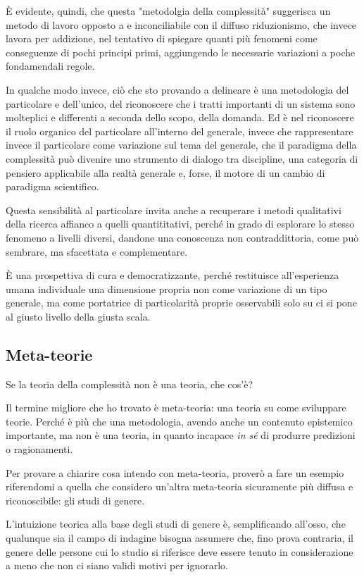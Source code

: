\documentclass[a4paper, headings=standardclasses]{scrartcl}
\begin{document}
È evidente, quindi, che questa "metodolgia della complessità" suggerisca un metodo di lavoro opposto a e inconciliabile con il diffuso riduzionismo, che invece lavora per addizione, nel tentativo di spiegare quanti più fenomeni come conseguenze di pochi principi primi, aggiungendo le necessarie variazioni a poche fondamendali regole.

In qualche modo invece, ciò che sto provando a delineare è una metodologia del particolare e dell'unico, del riconoscere che i tratti importanti di un sistema sono molteplici e differenti a seconda dello scopo, della domanda. Ed è nel riconoscere il ruolo organico del particolare all'interno del generale, invece che rappresentare invece il particolare come variazione sul tema del generale, che il paradigma della complessità può divenire uno strumento di dialogo tra discipline, una categoria di pensiero applicabile alla realtà generale e, forse, il motore di un cambio di paradigma scientifico.

Questa sensibilità al particolare invita anche a recuperare i metodi qualitativi della ricerca affianco a quelli quantititativi, perché in grado di esplorare lo stesso fenomeno a livelli diversi, dandone una conoscenza non contraddittoria, come può sembrare, ma sfacettata e complementare.

È una prospettiva di cura e democratizzante, perché restituisce all'esperienza umana individuale una dimensione propria non come variazione di un tipo generale, ma come portatrice di particolarità proprie osservabili solo su ci si pone al giusto livello della giusta scala.

\subsection{Meta-teorie}
Se la teoria della complessità non è una teoria, che cos'è?

Il termine migliore che ho trovato è meta-teoria: una teoria su come sviluppare teorie. Perché è più che una metodologia, avendo anche un contenuto epistemico importante, ma non è una teoria, in quanto incapace \textit{in sé} di produrre predizioni o ragionamenti.

Per provare a chiarire cosa intendo con meta-teoria, proverò a fare un esempio riferendomi a quella che considero un'altra meta-teoria sicuramente più diffusa e riconoscibile: gli studi di genere.

L'intuizione teorica alla base degli studi di genere è, semplificando all'osso, che qualunque sia il campo di indagine bisogna assumere che, fino prova contraria, il genere delle persone cui lo studio si riferisce deve essere tenuto in considerazione a meno che non ci siano validi motivi per ignorarlo.
\end{document}
